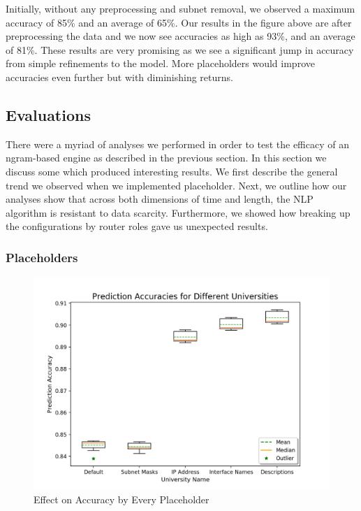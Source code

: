 Initially, without any preprocessing and subnet removal, we observed a maximum accuracy of 85\% and an average of 65\%. Our results in the figure above are after preprocessing the data and we now see accuracies as high as 93\%, and an average of 81\%. These results are very promising as we see a significant jump in accuracy from simple refinements to the model. More placeholders would improve accuracies even further but with diminishing returns.


\subsection{Evaluations}

There were a myriad of analyses we performed in order to test the efficacy of an ngram-based engine as described in the previous section. In this section we discuss some which produced interesting results. We first describe the general trend we observed when we implemented placeholder. Next, we outline how our analyses show that across both dimensions of time and length, the NLP algorithm is resistant to data scarcity. Furthermore, we showed how breaking up the configurations by router roles gave us unexpected results.

\subsubsection{Placeholders}

\begin{figure}[H]
	\centering
	\includegraphics[width=\textwidth]{placeholders.png}
	\caption{Effect on Accuracy by Every Placeholder}
\end{figure}


